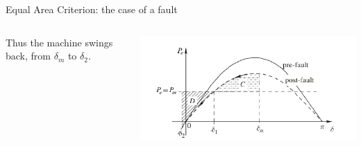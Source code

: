 \begin{frame}[allowframebreaks]{Equal Area Criterion: the case of a fault}
\begin{columns}
\begin{column}{0.5\textwidth}
        Thus the machine swings back, from $\delta_{m}$ to $\delta_{2}$.
    \end{column}
    \begin{column}{0.5\textwidth}
        \begin{center}
        \includegraphics[width=0.99\linewidth]{images/SwingsBack.png}
        \end{center}
    \end{column}
\end{columns}



\end{frame}
